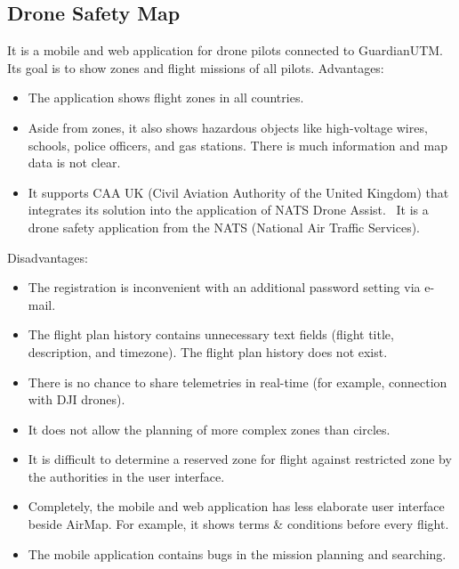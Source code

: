 \subsection{Drone Safety Map}\label{subsec:drone-safety-map}
It is a mobile and web application for drone pilots connected to GuardianUTM.
Its goal is to show zones and flight missions of all pilots.
\newline
\newline
Advantages:
\begin{itemize}
    \item The application shows flight zones in all countries.
    \item Aside from zones, it also shows hazardous objects like high-voltage wires, schools, police officers, and gas stations.
    There is much information and map data is not clear.
    \item It supports CAA UK (Civil Aviation Authority of the United Kingdom) that integrates its solution into the application of NATS Drone Assist.~\cite{droneAssist}
    It is a drone safety application from the NATS (National Air Traffic Services).
\end{itemize}
Disadvantages:
\begin{itemize}
    \item The registration is inconvenient with an additional password setting via e-mail.
    \item The flight plan history contains unnecessary text fields (flight title, description, and timezone).
    The flight plan history does not exist.
    \item There is no chance to share telemetries in real-time (for example, connection with DJI drones).
    \item It does not allow the planning of more complex zones than circles.
    \item It is difficult to determine a reserved zone for flight against restricted zone by the authorities in the user interface.
    \item Completely, the mobile and web application has less elaborate user interface beside AirMap.
    For example, it shows terms \& conditions before every flight.
    \item The mobile application contains bugs in the mission planning and searching.
\end{itemize}

